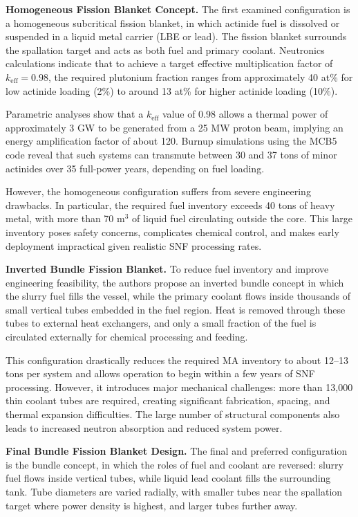 \textbf{Homogeneous Fission Blanket Concept.}  
The first examined configuration is a homogeneous subcritical fission blanket, in which actinide fuel is dissolved or suspended 
in a liquid metal carrier (LBE or lead). The fission blanket surrounds the spallation target and acts as both fuel and primary 
coolant. Neutronics calculations indicate that to achieve a target effective multiplication factor of $k_{\text{eff}} = 0.98$, 
the required plutonium fraction ranges from approximately 40 at\% for low actinide loading (2\%) to around 13 at\% for higher 
actinide loading (10\%).

Parametric analyses show that a $k_{\text{eff}}$ value of 0.98 allows a thermal power of approximately 3 GW to be generated 
from a 25 MW proton beam, implying an energy amplification factor of about 120. Burnup simulations using the MCB5 code reveal 
that such systems can transmute between 30 and 37 tons of minor actinides over 35 full-power years, depending on fuel loading.

However, the homogeneous configuration suffers from severe engineering drawbacks. In particular, the required fuel inventory 
exceeds 40 tons of heavy metal, with more than 70 m$^3$ of liquid fuel circulating outside the core. This large inventory poses 
safety concerns, complicates chemical control, and makes early deployment impractical given realistic SNF processing rates.

\textbf{Inverted Bundle Fission Blanket.}  
To reduce fuel inventory and improve engineering feasibility, the authors propose an inverted bundle concept in which the 
slurry fuel fills the vessel, while the primary coolant flows inside thousands of small vertical tubes embedded in the fuel region.
 Heat is removed through these tubes to external heat exchangers, and only a small fraction of the fuel is circulated externally 
 for chemical processing and feeding.

This configuration drastically reduces the required MA inventory to about 12--13 tons per system and allows operation to 
begin within a few years of SNF processing. However, it introduces major mechanical challenges: more than 13,000 thin coolant 
tubes are required, creating significant fabrication, spacing, and thermal expansion difficulties. The large number of structural 
components also leads to increased neutron absorption and reduced system power.

\textbf{Final Bundle Fission Blanket Design.}  
The final and preferred configuration is the bundle concept, in which the roles of fuel and coolant are reversed: slurry fuel 
flows inside vertical tubes, while liquid lead coolant fills the surrounding tank. Tube diameters are varied radially, with 
smaller tubes near the spallation target where power density is highest, and larger tubes further away.

